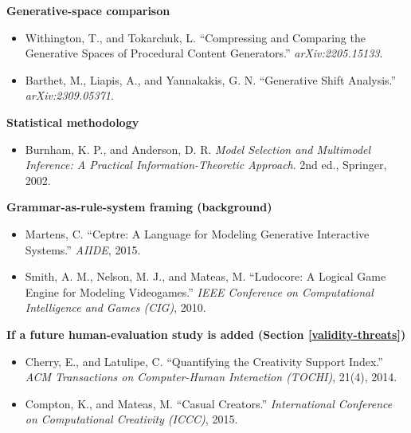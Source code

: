 \documentclass[]{article}
\begin{document}
        \textbf{Generative-space comparison}

        \begin{itemize}
            \item Withington, T., and Tokarchuk, L. ``Compressing and Comparing the Generative Spaces of Procedural Content Generators.'' \textit{arXiv:2205.15133}.
            \item Barthet, M., Liapis, A., and Yannakakis, G. N. ``Generative Shift Analysis.'' \textit{arXiv:2309.05371}.
        \end{itemize}
        
        \textbf{Statistical methodology}

        \begin{itemize}
            \item Burnham, K. P., and Anderson, D. R. \textit{Model Selection and Multimodel Inference: A Practical Information-Theoretic Approach}. 2nd ed., Springer, 2002.
        \end{itemize}
        
        \textbf{Grammar-as-rule-system framing (background)}

        \begin{itemize}
            \item Martens, C. ``Ceptre: A Language for Modeling Generative Interactive Systems.'' \textit{AIIDE}, 2015.
            \item Smith, A. M., Nelson, M. J., and Mateas, M. ``Ludocore: A Logical Game Engine for Modeling Videogames.'' \textit{IEEE Conference on Computational Intelligence and Games (CIG)}, 2010.
        \end{itemize}
            
        \textbf{If a future human-evaluation study is added (Section \ref{validity-threats})}

        \begin{itemize}
            \item Cherry, E., and Latulipe, C. ``Quantifying the Creativity Support Index.'' \textit{ACM Transactions on Computer-Human Interaction (TOCHI)}, 21(4), 2014.
            \item Compton, K., and Mateas, M. ``Casual Creators.'' \textit{International Conference on Computational Creativity (ICCC)}, 2015.
        \end{itemize}
\end{document}
